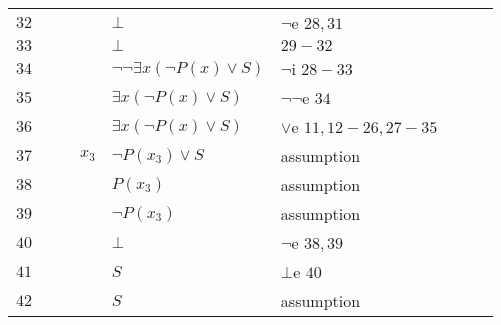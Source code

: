 \documentclass[a4paper,12pt]{article}
\begin{document}
\begin{tcolorbox}
\begin{tabular}{l l l l l l l l l}
    $32$  & \multicolumn{1}{|l}{} & \multicolumn{1}{|l}{} & \multicolumn{1}{|l}{} & $\bot$ & $\neg$e $28,31$ & \multicolumn{1}{l|}{} & \multicolumn{1}{l|}{} & \multicolumn{1}{l|}{} \\ \cline{4-7}
    
    $33$  & \multicolumn{1}{|l}{} & \multicolumn{1}{|l}{} & & $\bot$ & $29-32$ & & \multicolumn{1}{l|}{} & \multicolumn{1}{l|}{} \\ \cline{3-8}
    
    $34$  & \multicolumn{1}{|l}{} & & & $\neg \neg \exists x (\neg P(x) \vee S)$ & $\neg$i $28-33$ & & & \multicolumn{1}{l|}{} \\
    
    $35$  & \multicolumn{1}{|l}{} & & & $\exists x (\neg P(x) \vee S)$ & $\neg \neg$e $34$ & & & \multicolumn{1}{l|}{} \\ \cline{2-9}
    
    $36$  & & & & $\exists x (\neg P(x) \vee S)$ & $\vee$e $11,12-26,27-35$ & & & \\ \cline{2-9}
    
    $37$  & \multicolumn{1}{|l}{} & & $x_3$ & $\neg P(x_3) \vee S$ & assumption & & & \multicolumn{1}{l|}{} \\ \cline{3-8}
    
    $38$  & \multicolumn{1}{|l}{} & \multicolumn{1}{|l}{} & & $P(x_3)$ & assumption & & \multicolumn{1}{l|}{} & \multicolumn{1}{l|}{} \\ \cline{4-7}
    
    $39$  & \multicolumn{1}{|l}{} & \multicolumn{1}{|l}{} & \multicolumn{1}{|l}{} & $\neg P(x_3)$ & assumption & \multicolumn{1}{l|}{} & \multicolumn{1}{l|}{} & \multicolumn{1}{l|}{} \\
    
    $40$  & \multicolumn{1}{|l}{} & \multicolumn{1}{|l}{} & \multicolumn{1}{|l}{} & $\bot$ & $\neg$e $38,39$ & \multicolumn{1}{l|}{} & \multicolumn{1}{l|}{} & \multicolumn{1}{l|}{} \\
    
    $41$  & \multicolumn{1}{|l}{} & \multicolumn{1}{|l}{} & \multicolumn{1}{|l}{} & $S$ & $\bot$e $40$ & \multicolumn{1}{l|}{} & \multicolumn{1}{l|}{} & \multicolumn{1}{l|}{} \\ \cline{4-7} \cline{4-7}
    
    $42$  & \multicolumn{1}{|l}{} & \multicolumn{1}{|l}{} & \multicolumn{1}{|l}{} & $S$ & assumption & \multicolumn{1}{l|}{} & \multicolumn{1}{l|}{} & \multicolumn{1}{l|}{} \\ \cline{4-7}
    

\end{tabular}
\end{tcolorbox}
\end{document}
